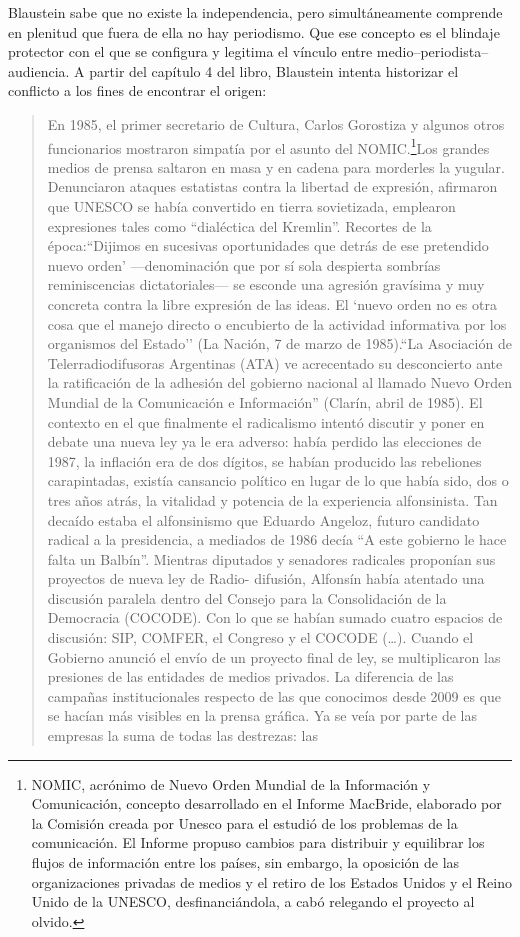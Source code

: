 {Blaustein sabe que no existe la independencia, pero simultáneamente comprende en plenitud que fuera de ella no hay periodismo. Que ese concepto es el blindaje protector con el que se configura y legitima el vínculo entre medio--periodista--audiencia. A partir del capítulo 4 del libro, Blaustein intenta historizar el conflicto a los fines de encontrar el origen:

\begin{quote}
En 1985, el primer secretario de Cultura, Carlos Gorostiza y algunos otros funcionarios mostraron simpatía por el asunto del NOMIC.\footnote{NOMIC, acrónimo de Nuevo Orden Mundial de la Información y Comunicación, concepto desarrollado en el Informe MacBride, elaborado por la Comisión creada por Unesco para el estudió de los problemas de la comunicación. El Informe propuso cambios para distribuir y equilibrar los flujos de información entre los países, sin embargo, la oposición de las organizaciones privadas de medios y el retiro de los Estados Unidos y el Reino Unido de la UNESCO, desfinanciándola, a cabó relegando el proyecto al olvido.}Los grandes medios de prensa saltaron en masa y en cadena para morderles la yugular. Denunciaron ataques estatistas contra la libertad de expresión, afirmaron que UNESCO se había convertido en tierra sovietizada, emplearon expresiones tales como ``dialéctica del Kremlin''. Recortes de la época:``Dijimos en sucesivas oportunidades que detrás de ese pretendido \textquotesingle nuevo orden' ---denominación que por sí sola despierta sombrías reminiscencias dictatoriales--- se esconde una agresión gravísima y muy concreta contra la libre expresión de las ideas. El `nuevo orden\textquotesingle{} no es otra cosa que el manejo directo o encubierto de la actividad informativa por los organismos del Estado'' (La Nación, 7 de marzo de 1985).``La Asociación de Telerradiodifusoras Argentinas (ATA) ve acrecentado su desconcierto ante la ratificación de la adhesión del gobierno nacional al llamado Nuevo Orden Mundial de la Comunicación e Información'' (Clarín, abril de 1985). El contexto en el que finalmente el radicalismo intentó discutir y poner en debate una nueva ley ya le era adverso: había perdido las elecciones de 1987, la inflación era de dos dígitos, se habían producido las rebeliones carapintadas, existía cansancio político en lugar de lo que había sido, dos o tres años atrás, la vitalidad y potencia de la experiencia alfonsinista. Tan decaído estaba el alfonsinismo que Eduardo Angeloz, futuro candidato radical a la presidencia, a mediados de 1986 decía ``A este gobierno le hace falta un Balbín''. Mientras diputados y senadores radicales proponían sus proyectos de nueva ley de Radio- difusión, Alfonsín había atentado una discusión paralela dentro del Consejo para la Consolidación de la Democracia (COCODE). Con lo que se habían sumado cuatro espacios de discusión: SIP, COMFER, el Congreso y el COCODE (\ldots). Cuando el Gobierno anunció el envío de un proyecto final de ley, se multiplicaron las presiones de las entidades de medios privados. La diferencia de las campañas institucionales respecto de las que conocimos desde 2009 es que se hacían más visibles en la prensa gráfica. Ya se veía por parte de las empresas la suma de todas las destrezas: las 
\end{quote}}
